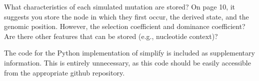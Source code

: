 \begin{point}{}
What characteristics of each simulated mutation are stored? On page 10, it
suggests you store the node in which they first occur, the derived state, and
the genomic position. However, the selection coefficient and dominance
coefficient? Are there other features that can be stored (e.g., nucleotide
context)?
\end{point}


\begin{point}{}
The code for the Python implementation of simplify is included as supplementary
information. This is entirely unnecessary, as this code should be easily
accessible from the appropriate github repository.
\end{point}

